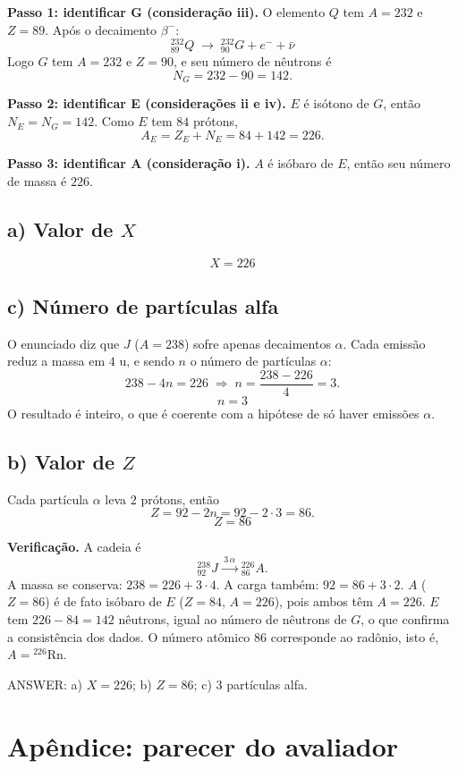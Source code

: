 \documentclass{article}%
\begin{document}
\textbf{Passo 1: identificar G (consideração iii).} O elemento $Q$ tem $A=232$ e $Z=89$. Após o decaimento $\beta^-$:
\[
{}^{232}_{89}Q \;\longrightarrow\; {}^{232}_{90}G + e^- + \bar{\nu}
\]
Logo $G$ tem $A=232$ e $Z=90$, e seu número de nêutrons é
\[
N_G = 232 - 90 = 142 .
\]

\textbf{Passo 2: identificar E (considerações ii e iv).} $E$ é isótono de $G$, então $N_E = N_G = 142$. Como $E$ tem $84$ prótons,
\[
A_E = Z_E + N_E = 84 + 142 = 226 .
\]

\textbf{Passo 3: identificar A (consideração i).} $A$ é isóbaro de $E$, então seu número de massa é $226$.

\subsection*{a) Valor de $X$}
\[
\boxed{X = 226}
\]

\subsection*{c) Número de partículas alfa}
O enunciado diz que $J$ ($A=238$) sofre apenas decaimentos $\alpha$. Cada emissão reduz a massa em $4$ u, e sendo $n$ o número de partículas $\alpha$:
\[
238 - 4n = 226 \;\Rightarrow\; n = \frac{238-226}{4} = 3 .
\]
\[
\boxed{n = 3}
\]
O resultado é inteiro, o que é coerente com a hipótese de só haver emissões $\alpha$.

\subsection*{b) Valor de $Z$}
Cada partícula $\alpha$ leva $2$ prótons, então
\[
Z = 92 - 2n = 92 - 2\cdot 3 = 86 .
\]
\[
\boxed{Z = 86}
\]

\textbf{Verificação.} A cadeia é
\[
{}^{238}_{92}J \xrightarrow{\;3\,\alpha\;} {}^{226}_{86}A .
\]
A massa se conserva: $238 = 226 + 3\cdot 4$. A carga também: $92 = 86 + 3\cdot 2$. $A$ ($Z=86$) é de fato isóbaro de $E$ ($Z=84$, $A=226$), pois ambos têm $A=226$. $E$ tem $226-84=142$ nêutrons, igual ao número de nêutrons de $G$, o que confirma a consistência dos dados. O número atômico $86$ corresponde ao radônio, isto é, $A = {}^{226}\mathrm{Rn}$.

ANSWER: a) $X = 226$; b) $Z = 86$; c) $3$ partículas alfa.%
\newpage%
\section*{Apêndice: parecer do avaliador}%
\end{document}
